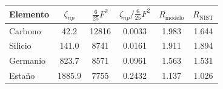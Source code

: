 \begin{tabular}{lccccc}
    \toprule
    \textbf{Elemento} & $\zeta_{np}$ & $\frac{6}{25}F^2$ & $\zeta_{np}\big/\frac{6}{25}F^2$ & $R_{\text{modelo}}$ & $R_{\text{NIST}}$ \\
    \midrule
    Carbono & 42.2 & 12816 & 0.0033 & 1.983 & 1.644 \\
    Silicio & 141.0 & 8741 & 0.0161 & 1.911 & 1.894 \\
    Germanio & 823.7 & 8571 & 0.0961 & 1.563 & 1.531 \\
    Estaño & 1885.9 & 7755 & 0.2432 & 1.137 & 1.026 \\
    \bottomrule
\end{tabular}
